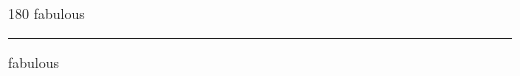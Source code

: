 
\begin{frame}
\begin{center}
\begin{turn}{180}
{\fontsize{2.5cm}{1em}\selectfont fabulous}
\end{turn}
\vspace{1em}\par  
\hrule
\vspace{1em}\par  
{\fontsize{2.5cm}{1em}\selectfont fabulous}
\end{center}
\end{frame}
